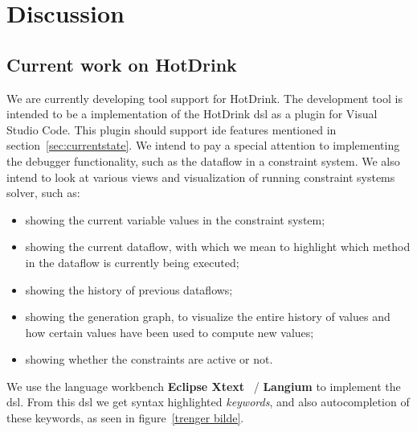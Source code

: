 \chapter{Discussion}
\label{chap:discussion}


\section{Current work on HotDrink}
We are currently developing tool support for HotDrink. The development tool is intended 
to be a implementation of the HotDrink \gls{dsl} as a plugin for Visual Studio Code. 
This plugin should support \gls{ide} features mentioned in section~\ref{sec:currentstate}. 
We intend to pay a special attention to implementing the debugger functionality, such as 
the dataflow in a constraint system. We also intend to look at various views and 
visualization of running constraint systems solver, such as: 
\begin{itemize}
    \item showing the current variable values in the constraint system;
    \item showing the current dataflow, with which we mean to highlight which method in the dataflow is currently being executed;
    \item showing the history of previous dataflows;
    \item showing the generation graph, to visualize the entire history of values and how certain values have been used to compute new values;
    \item showing whether the constraints are active or not.
\end{itemize}

We use the language workbench \textbf{Eclipse Xtext}~\cite{eysholdt_xtext:_2010} / 
\textbf{Langium} to implement the \gls{dsl}. From this \gls{dsl} we get syntax 
highlighted \textit{keywords}, and also autocompletion of these keywords, as seen in figure~\ref{trenger bilde}. 
